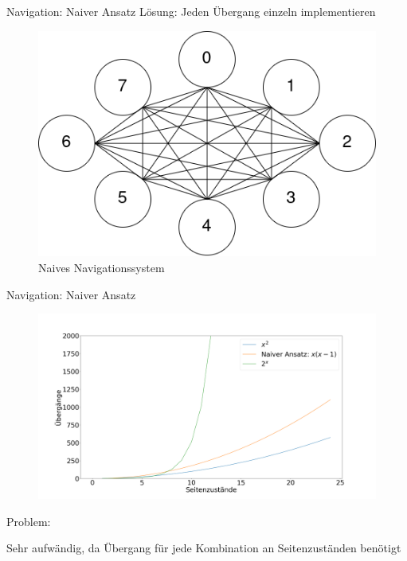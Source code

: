 \documentclass{beamer}
\begin{document}
\begin{frame}{Navigation: Naiver Ansatz}
Lösung: Jeden Übergang einzeln implementieren
\begin{figure}
\center
\begin{minipage}{.6\textwidth}
\includegraphics[width=\textwidth]{figures/navigationsystem-all-overview.png}
\end{minipage}
\caption{Naives Navigationssystem}
\end{figure}
\end{frame}

\begin{frame}{Navigation: Naiver Ansatz}
\begin{figure}
\center
\begin{minipage}{\textwidth}
\includegraphics[width=\textwidth]{figures/naive_transitions.png}
\end{minipage}
\end{figure}
Problem:\\
\hspace{1em}%
\begin{minipage}[c]{0.95\textwidth}
\flushleft Sehr aufwändig, da Übergang für jede Kombination an Seitenzuständen benötigt
\end{minipage}
\end{frame}
\end{document}
